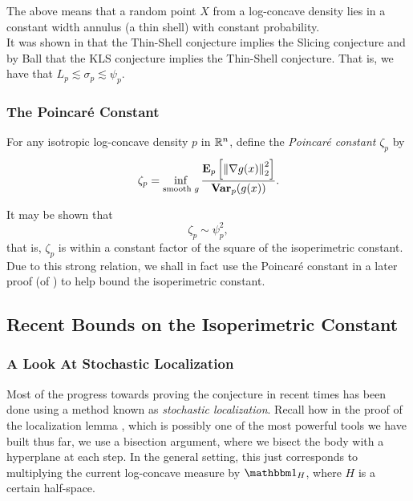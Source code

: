 		The above means that a random point $X$ from a log-concave density lies in a constant width annulus (a thin shell) with constant probability.\\

		It was shown in \cite{Eldan2010ApproximatelyGM} that the Thin-Shell conjecture implies the Slicing conjecture and by Ball that the KLS conjecture implies the Thin-Shell conjecture. That is, we have that $L_p \lesssim \sigma_p \lesssim \psi_p$.

	\subsubsection{The Poincar\'{e} Constant}
		\label{sec: poincare constant}

		\begin{fdef}
			For any isotropic log-concave density $p$ in $\mathbb{R}^n$, define the \textit{Poincar\'{e} constant} $\zeta_p$ by
			\[ \zeta_p = \inf_{\text{smooth $g$}} \frac{ \textbf{E}_p \left[\left\lVert\nabla g(x) \right\rVert_2^2\right] }{ \operatorname{\textbf{Var}}_p (g(x)) }. \]
		\end{fdef}

		It may be shown that
		\[ \zeta_p \sim \psi_p^2, \]
		that is, $\zeta_p$ is within a constant factor of the square of the isoperimetric constant. Due to this strong relation, we shall in fact use the Poincar\'{e} constant in a later proof (of ) to help bound the isoperimetric constant.

\subsection{Recent Bounds on the Isoperimetric Constant}

	\subsubsection{A Look At Stochastic Localization}


		Most of the progress towards proving the conjecture in recent times has been done using a method known as \textit{stochastic localization}. Recall how in the proof of the localization lemma , which is possibly one of the most powerful tools we have built thus far, we use a bisection argument, where we bisect the body with a hyperplane at each step. In the general setting, this just corresponds to multiplying the current log-concave measure by $\indic_{H}$, where $H$ is a certain half-space.\\

